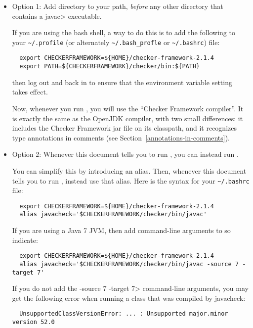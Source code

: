 \begin{itemize}
  \item
    Option 1:
    Add directory
     to your path, \emph{before} any other
    directory that contains a \<javac> executable.

    If you are
    using the bash shell, a way to do this is to add the following to your
    \verb|~/.profile| (or alternately \verb|~/.bash_profle| or \verb|~/.bashrc|) file:
\begin{Verbatim}
  export CHECKERFRAMEWORK=${HOME}/checker-framework-2.1.4
  export PATH=${CHECKERFRAMEWORK}/checker/bin:${PATH}
\end{Verbatim}
    then log out and back in to ensure that the environment variable
    setting takes effect.

    Now, whenever you run , you will use the ``Checker
    Framework compiler''.  It is exactly the same as the OpenJDK compiler,
    with two small differences:  it includes the Checker Framework jar file
    on its classpath, and it recognizes type annotations in comments (see
    Section~\ref{annotations-in-comments}).

  \item
    \begin{sloppypar}
    Option 2:
    Whenever this document tells you to run , you
    can instead run .
    \end{sloppypar}

    You can simplify this by introducing an alias.  Then,
    whenever this document tells you to run , instead use that
    alias.  Here is the syntax for your
    \verb|~/.bashrc| file:
\begin{Verbatim}
  export CHECKERFRAMEWORK=${HOME}/checker-framework-2.1.4
  alias javacheck='$CHECKERFRAMEWORK/checker/bin/javac'
\end{Verbatim}

    If you are using a Java 7 JVM, then add command-line arguments to so
    indicate:

\begin{Verbatim}
  export CHECKERFRAMEWORK=${HOME}/checker-framework-2.1.4
  alias javacheck='$CHECKERFRAMEWORK/checker/bin/javac -source 7 -target 7'
\end{Verbatim}

   If you do not add the \<-source 7 -target 7> command-line arguments, you
   may get the following error when running a class that was compiled by
   javacheck:
\begin{Verbatim}
  UnsupportedClassVersionError: ... : Unsupported major.minor version 52.0
\end{Verbatim}


\end{itemize}
